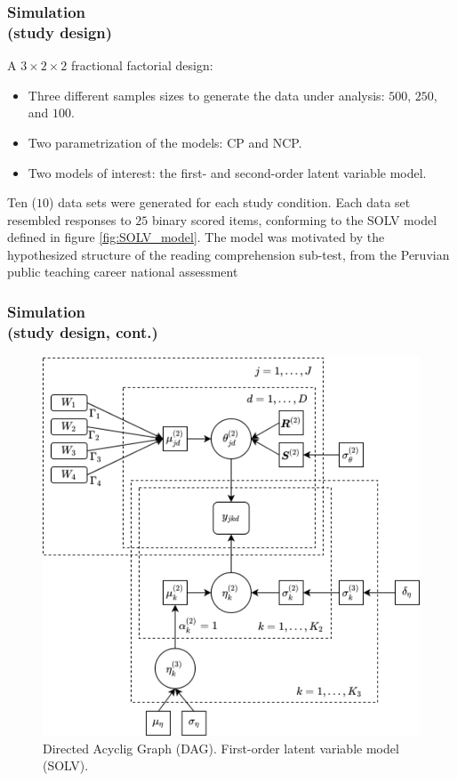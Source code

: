 \documentclass[nonav,sleutel]{beamer}
\begin{document}
	\begin{frame}
		\frametitle{Simulation \\
			(study design)}
		A $3 \times 2 \times 2$ fractional factorial design:
		\begin{itemize}
			\item Three different samples sizes to generate the data under analysis: $500$, $250$, and $100$.
			\item Two parametrization of the models: CP and NCP.
			\item Two models of interest: the first- and second-order latent variable model.
		\end{itemize}
		Ten ($10$) data sets were generated for each study condition. Each data set resembled responses to $25$ binary scored items, conforming to the SOLV model defined in figure \ref{fig:SOLV_model}. The model was motivated by the hypothesized structure of the reading comprehension sub-test, from the Peruvian public teaching career national assessment
	\end{frame}
	\begin{frame}
		\frametitle{Simulation \\
			(study design, cont.)}
		\begin{figure}[h]
			\centering
			\includegraphics[width=0.60\linewidth]{4_FOLV_dag}
			\caption{Directed Acyclig Graph (DAG). First-order latent variable model (SOLV).}
			\label{fig:FOLV_model}
		\end{figure}
	\end{frame}
\end{document}

